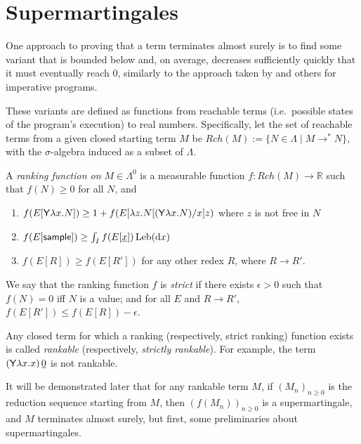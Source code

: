 \section{Supermartingales}
\label{sec:supermartingales}

One approach to proving that a term terminates almost surely is to find some variant that is bounded below and, on average, decreases sufficiently quickly that it must eventually reach 0, similarly to the approach taken by 
\cite{DBLP:conf/popl/FioritiH15} and others for imperative programs.

These variants are defined as functions from reachable terms (i.e.~possible states of the program's execution) to real numbers. Specifically, let the set of reachable terms from a given closed starting term $M$ be $Rch(M) := \{N \in \Lambda \mid M \to^* N \}$, with the $\sigma$-algebra induced as a subset of $\Lambda$.

\begin{definition}\rm
A \emph{ranking function on $M \in \Lambda^0$} is a measurable function $f:\mathit{Rch}(M) \to \mathbb{R}$ such that $f(N) \geq 0$ for all $N$, and
\begin{enumerate}
    \item $f(E[\mathsf{Y} \lambda x. N]) \geq 1+ f(E[\lambda z. N[(\mathsf{Y} \lambda x. N)/x] z)$ where $z$ is not free in $N$
    \item $f(E[\mathsf{sample}]) \geq \int_I f(E[\underline{x}]) \, \mathrm{Leb}(\mathrm{d}x)$
    \item $f(E[R]) \geq f(E[R'])$ for any other redex $R$, where $R \to R'$.
\end{enumerate}
We say that the ranking function $f$ is \emph{strict} if there exists $\epsilon > 0$ such that $f(N) = 0$ iff $N$ is a value; and for all $E$ and $R \to R'$, $f(E[R']) \leq f(E[R]) - \epsilon$.

Any closed term for which a ranking (respectively, strict ranking) function exists is called \emph{rankable} (respectively, \emph{strictly rankable}). 
For example, the term $(\mathsf{Y} \lambda x.x) \, \underline 0$ is not rankable.
\end{definition}

It will be demonstrated later that for any rankable term $M$, if $(M_n)_{n \geq 0}$ is the reduction sequence starting from $M$, then $(f(M_n))_{n \geq 0}$ is a supermartingale, and $M$ terminates almost surely, but first, some preliminaries about supermartingales.

